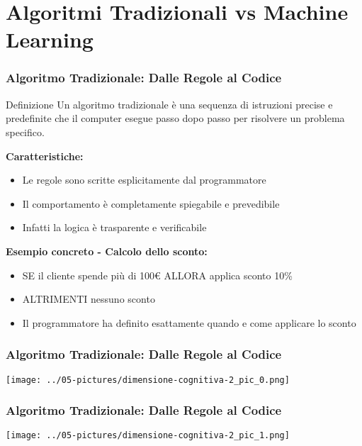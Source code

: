 \documentclass[aspectratio=169]{beamer}
\begin{document}
\section{Algoritmi Tradizionali vs Machine Learning}
%
%
\begin{frame}
\frametitle{Algoritmo Tradizionale: Dalle Regole al Codice}
\begin{block}{Definizione}
Un algoritmo tradizionale è una sequenza di istruzioni precise e predefinite che il computer esegue passo dopo passo per risolvere un problema specifico.
\end{block}

\textbf{Caratteristiche:}
\begin{itemize}
\item Le regole sono scritte esplicitamente dal programmatore
\item Il comportamento è completamente spiegabile e prevedibile
\item Infatti la logica è trasparente e verificabile
\end{itemize}

\textbf{Esempio concreto - Calcolo dello sconto:}
\begin{itemize}
\item SE il cliente spende più di 100€ ALLORA applica sconto 10\%
\item ALTRIMENTI nessuno sconto
\item Il programmatore ha definito esattamente quando e come applicare lo sconto
\end{itemize}
\end{frame}
%
%
\begin{frame}
\frametitle{Algoritmo Tradizionale: Dalle Regole al Codice}
\begin{center}
\texttt{[image: ../05-pictures/dimensione-cognitiva-2\_pic\_0.png]} 
\end{center}
\end{frame}
%
%
\begin{frame}
\frametitle{Algoritmo Tradizionale: Dalle Regole al Codice}
\begin{center}
\texttt{[image: ../05-pictures/dimensione-cognitiva-2\_pic\_1.png]} 
\end{center}
\end{frame}
%
\end{document}
